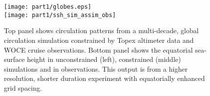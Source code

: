 \begin{figure}
 \begin{center}
   \texttt{[image: part1/globes.eps]}
\\
   \texttt{[image: part1/ssh\_sim\_assim\_obs]}
 \end{center}
\caption{Top panel shows circulation patterns from a
multi-decade, global circulation simulation constrained by Topex altimeter
data and WOCE cruise observations. Bottom panel shows the equatorial
sea-surface height in unconstrained (left), constrained (middle) simulations
and in observations. This output is from a higher resolution, shorter
duration experiment with equatorially enhanced grid spacing.}
\label{fig:assimilated-globes}
\end{figure}

